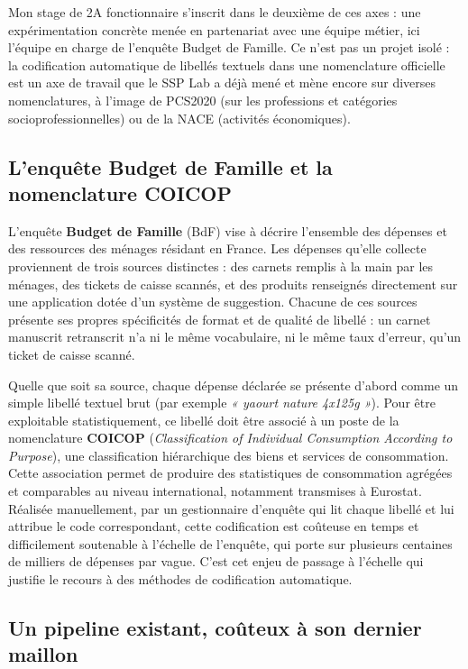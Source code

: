 \documentclass[
]{rapportCS}
\begin{document}
Mon stage de 2A fonctionnaire s'inscrit dans le deuxième de ces axes :
une expérimentation concrète menée en partenariat avec une équipe
métier, ici l'équipe en charge de l'enquête Budget de Famille. Ce n'est
pas un projet isolé : la codification automatique de libellés textuels
dans une nomenclature officielle est un axe de travail que le SSP Lab a
déjà mené et mène encore sur diverses nomenclatures, à l'image de
PCS2020 (sur les professions et catégories socioprofessionnelles) ou de
la NACE (activités économiques).

\subsection{L'enquête Budget de Famille et la nomenclature
COICOP}\label{lenquuxeate-budget-de-famille-et-la-nomenclature-coicop}

L'enquête \textbf{Budget de Famille} (BdF) vise à décrire l'ensemble des
dépenses et des ressources des ménages résidant en France. Les dépenses
qu'elle collecte proviennent de trois sources distinctes : des carnets
remplis à la main par les ménages, des tickets de caisse scannés, et des
produits renseignés directement sur une application dotée d'un système
de suggestion. Chacune de ces sources présente ses propres spécificités
de format et de qualité de libellé : un carnet manuscrit retranscrit n'a
ni le même vocabulaire, ni le même taux d'erreur, qu'un ticket de caisse
scanné.

Quelle que soit sa source, chaque dépense déclarée se présente d'abord
comme un simple libellé textuel brut (par exemple \emph{« yaourt nature
4x125g »}). Pour être exploitable statistiquement, ce libellé doit être
associé à un poste de la nomenclature \textbf{COICOP}
(\emph{Classification of Individual Consumption According to Purpose}),
une classification hiérarchique des biens et services de consommation.
Cette association permet de produire des statistiques de consommation
agrégées et comparables au niveau international, notamment transmises à
Eurostat. Réalisée manuellement, par un gestionnaire d'enquête qui lit
chaque libellé et lui attribue le code correspondant, cette codification
est coûteuse en temps et difficilement soutenable à l'échelle de
l'enquête, qui porte sur plusieurs centaines de milliers de dépenses par
vague. C'est cet enjeu de passage à l'échelle qui justifie le recours à
des méthodes de codification automatique.

\subsection{Un pipeline existant, coûteux à son dernier
maillon}\label{un-pipeline-existant-couxfbteux-uxe0-son-dernier-maillon}
\end{document}
